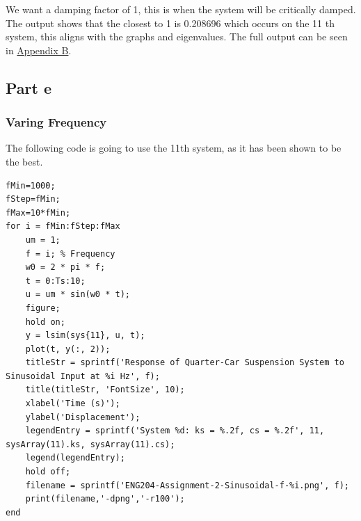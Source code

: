 \documentclass[11pt]{article}
\begin{document}
We want a damping factor of 1, this is when the system will be critically damped. The output shows that the closest to 1 is 0.208696 which occurs on the 11 th system, this aligns with the graphs and eigenvalues. The full output can be seen in \hyperref[sec:org2a10006]{Appendix B}.
\subsection{Part e}
\label{sec:orgdd4ad96}
\subsubsection{Varing Frequency}
\label{sec:orgfb1537d}
The following code is going to use the 11th system, as it has been shown to be the best.
\begin{verbatim}
fMin=1000;
fStep=fMin;
fMax=10*fMin;
for i = fMin:fStep:fMax
    um = 1;
    f = i; % Frequency
    w0 = 2 * pi * f;
    t = 0:Ts:10;
    u = um * sin(w0 * t);
    figure;
    hold on;
    y = lsim(sys{11}, u, t);
    plot(t, y(:, 2));
    titleStr = sprintf('Response of Quarter-Car Suspension System to Sinusoidal Input at %i Hz', f);
    title(titleStr, 'FontSize', 10);
    xlabel('Time (s)');
    ylabel('Displacement');
    legendEntry = sprintf('System %d: ks = %.2f, cs = %.2f', 11, sysArray(11).ks, sysArray(11).cs);
    legend(legendEntry);
    hold off;
    filename = sprintf('ENG204-Assignment-2-Sinusoidal-f-%i.png', f);
    print(filename,'-dpng','-r100');
end
\end{verbatim}
\end{document}
